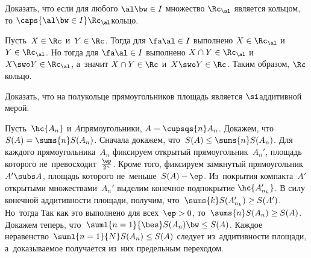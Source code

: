 \documentclass[a4paper,draft]{article}
\begin{document}
\begin{problem}
  Доказать, что если для любого $\al \bw \in I$ множество $\Rc_\al$ является кольцом, то
  $\caps{\al \bw\in I} \Rc_\al$\т кольцо.
\end{problem}
\begin{solution}
  Пусть~$X\in\Rc$ и~$Y\in\Rc$. Тогда для $\fa \al \in I$ выполнено $X \in\Rc_\al$ и~$Y\in\Rc_\al$.
  Но тогда для $\fa \al\in I$ выполнено $X\cap Y\in\Rc_\al$ и~$X\swo Y\in\Rc_\al$, а~значит
  $X\cap Y\in\Rc$ и~$X\swo Y\in \Rc$. Таким образом, $\Rc$\Т кольцо.
\end{solution}

\begin{problem}
  Доказать, что на полукольце прямоугольников площадь является $\si$\д аддитивной мерой.
\end{problem}
\begin{solution}
  Пусть~$\hc{A_n}$ и $A$\т прямоугольники, $A = \cupsqs{n} A_n$. Докажем, что~$S(A) =
  \sums{n} S(A_n)$. Сначала докажем, что~$S(A)\le \sums{n} S(A_n)$. Для каждого
  прямоугольника~$A_n$ фиксируем открытый прямоугольник~$A_n'$, площадь которого
  не~превосходит~$\frac{\ep}{2^n}$. Кроме того, фиксируем замкнутый
  прямоугольник~$A'\subs A$, площадь которого не~меньше~$S(A)-\ep$.
  Из~покрытия компакта~$A'$ открытыми множествами~$A_n'$ выделим конечное
  подпокрытие $\hc{A_{n_k}'}$. В силу конечной аддитивности площади, получим,
  что~$\sums{k} S(A_{n_k}')\ge S(A')$. Но~тогда
  Так как это   выполнено для всех~$\ep>0$, то~$\sums{n} S(A_n)\ge S(A)$. Докажем теперь,
  что~$\suml{n=1}{\bes} S(A_n) \bw\le S(A)$. Каждое неравенство~$\suml{n=1}{N}
  S(A_n)\le S(A)$ следует из~аддитивности площади, а~доказываемое получается
  из~них предельным переходом.
\end{solution}
\end{document}
